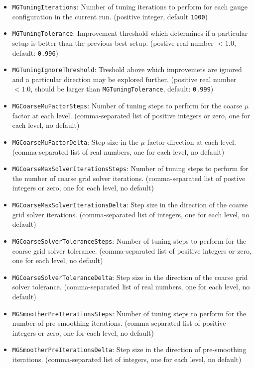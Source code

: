 \begin{itemize}
  \item \texttt{MGTuningIterations}: Number of tuning iterations to perform for each gauge configuration in the current run. (positive integer, default \texttt{1000})
  \item \texttt{MGTuningTolerance}: Improvement threshold which determines if a particular setup is better than the previous best setup. (postive real number $< 1.0$, default: \texttt{0.996})
  \item \texttt{MGTuningIgnoreThreshold}: Treshold above which improvemets are ignored and a particular direction may be explored further. (positive real number $< 1.0$, should be larger than \texttt{MGTuningTolerance}, default: \texttt{0.999}) 
  \item \texttt{MGCoarseMuFactorSteps}: Number of tuning steps to perform for the coarse $\mu$ factor at each level. (comma-separated list of positive integers or zero, one for each level, no default)
  \item \texttt{MGCoarseMuFactorDelta}: Step size in the $\mu$ factor direction at each level. (comma-separated list of real numbers, one for each level, no default)
  \item \texttt{MGCoarseMaxSolverIterationsSteps}: Number of tuning steps to perform for the number of coarse grid solver iterations. (comma-separated list of postive integers or zero, one for each level, no default)
  \item \texttt{MGCoarseMaxSolverIterationsDelta}: Step size in the direction of the coarse grid solver iterations. (comma-separated list of integers, one for each level, no default)
  \item \texttt{MGCoarseSolverToleranceSteps}: Number of tuning steps to perform for the coarse grid solver tolerance. (comma-separated list of positive integers or zero, one for each level, no default)
  \item \texttt{MGCoarseSolverToleranceDelta}: Step size in the direction of the coarse grid solver tolerance. (comma-separated list of real numbers, one for each level, no default)
  \item \texttt{MGSmootherPreIterationsSteps}: Number of tuning steps to perform for the number of pre-smoothing iterations. (comma-separated list of positive integers or zero, one for each level, no default)
  \item \texttt{MGSmootherPreIterationsDelta}: Step size in the direction of pre-smoothing iterations. (comma-separated list of integers, one for each level, no default)

\end{itemize}
